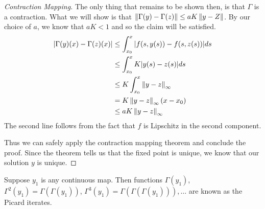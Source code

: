 \begin{proof}[Contraction Mapping]
    The only thing that remains to be shown then, is that $\Gamma$ is a contraction. What we will show is that $\left\lVert\Gamma(y) - \Gamma(z)\right\rVert \leq aK \left\lVert y - Z\right\rVert$. By our choice of $a$, we know that $aK < 1$ and so the claim will be satisfied.
    \begin{align*}
        |\Gamma(y)(x) - \Gamma(z)(x)| &\leq \int_{x_0}^{x} |f(s, y(s)) - f(s, z(s))| ds\\
        &\leq \int_{x_0}^{x} K|y(s) - z(s)| ds\\
        &\leq K \int_{x_0}^{x} \left\lVert y - z\right\rVert_{\infty}\\
        &= K \left\lVert y - z\right\rVert_{\infty} (x - x_0)\\
        &\leq aK \left\lVert y - z\right\rVert_{\infty}
    \end{align*}
    The second line follows from the fact that $f$ is Lipschitz in the second component.
    
    Thus we can safely apply the contraction mapping theorem and conclude the proof. Since the theorem tells us that the fixed point is unique, we know that our solution $y$ is unique.
\end{proof}
\begin{remark}
    Suppose $y_1$ is any continuous map. Then functions $\Gamma(y_1)$, $\Gamma^2(y_1) = \Gamma(\Gamma(y_1))$, $\Gamma^3(y_1) = \Gamma(\Gamma(\Gamma(y_1))), \dots$ are known as the Picard iterates.
\end{remark}

